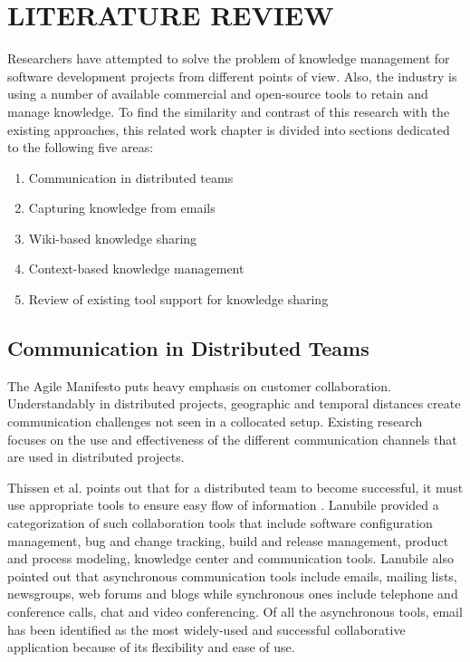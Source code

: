 \fancyhead[RO,LE]{\thepage}
\fancyfoot{} 
\chapter{LITERATURE REVIEW}
\label{literature_review}
Researchers have attempted to solve the problem of knowledge management for software development projects from different points of view. Also, the industry is using a number of available commercial and open-source tools to retain and manage knowledge. To find the similarity and contrast of this research with the existing approaches, this related work chapter is divided into sections dedicated to the following five areas:

\begin{enumerate}
	\item Communication in distributed teams
	\item Capturing knowledge from emails
	\item Wiki-based knowledge sharing
	\item Context-based knowledge management
	\item Review of existing tool support for knowledge sharing
\end{enumerate}

\section{Communication in Distributed Teams}
The Agile Manifesto \cite{am} puts heavy emphasis on customer collaboration. Understandably in distributed projects, geographic and temporal distances create communication challenges not seen in a collocated setup. Existing research focuses on the use and effectiveness of the different communication channels that are used in distributed projects.

Thissen et al. points out that for a distributed team to become successful, it must use appropriate tools to ensure easy flow of information \cite{communication_tools}. Lanubile provided a categorization of such collaboration tools \cite{communication_in_distributed} that include software configuration management, bug and change tracking, build and release management, product and process modeling, knowledge center and communication tools. Lanubile also pointed out that asynchronous communication tools include emails, mailing lists, newsgroups, web forums and blogs while synchronous ones include telephone and conference calls, chat and video conferencing. Of all the asynchronous tools, email has been identified as the most widely-used and successful collaborative application because of its flexibility and ease of use.

